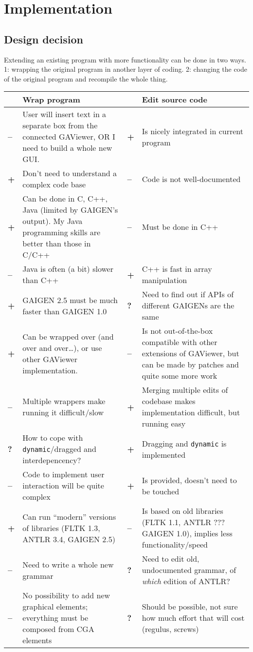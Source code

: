 \section{Implementation}
\label{ch:implementation}


\subsection{Design decision}

Extending an existing program with more functionality can be done in two ways. 1: wrapping the original program in another layer of coding. 2: changing the code of the original program and recompile the whole thing.

\newcommand{\pro}{\textbf{+} &}
\newcommand{\con}{\textbf{--} &}
\newcommand{\que}{\textbf{?} &}
\begin{tabular}{p{0.5cm}p{5.5cm}|p{0.5cm}p{5.5cm}}
  & Wrap program & & Edit source code \\
  \hline
  \con User will insert text in a separate box from the connected GAViewer, OR I need to build a whole new GUI. & \pro Is nicely integrated in current program \\
  \pro Don't need to understand a complex code base & \con Code is not well-documented \\
  \pro Can be done in C, C++, Java (limited by GAIGEN's output). My Java programming skills are better than those in C/C++ & \con Must be done in C++ \\
  \con Java is often (a bit) slower than C++ & \pro C++ is fast in array manipulation \\
  \pro GAIGEN 2.5 must be much faster than GAIGEN 1.0 & \que Need to find out if APIs of different GAIGENs are the same \\
  \pro Can be wrapped over (and over and over\ldots), or use other GAViewer implementation. & \con Is not out-of-the-box compatible with other extensions of GAViewer, but can be made by patches and quite some more work \\
  \con Multiple wrappers make running it difficult/slow & \pro Merging multiple edits of codebase makes implementation difficult, but running easy \\
  \que How to cope with \texttt{dynamic}/dragged and interdepencency? & \pro Dragging and \texttt{dynamic} is implemented \\
  \con Code to implement user interaction will be quite complex & \pro Is provided, doesn't need to be touched \\
  \pro Can run ``modern'' versions of libraries (FLTK 1.3, ANTLR 3.4, GAIGEN 2.5) & \con Is based on old libraries (FLTK 1.1, ANTLR ??? GAIGEN 1.0), implies less functionality/speed \\
  \con Need to write a whole new grammar & \que Need to edit old, undocumented grammar, of \emph{which} edition of ANTLR? \\
  \con No possibility to add new graphical elements; everything must be composed from CGA elements & \que Should be possible, not sure how much effort that will cost (regulus, screws)
\end{tabular}


